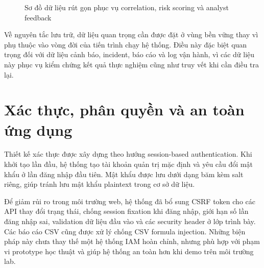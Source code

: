 \documentclass[a4paper,12pt,oneside]{book}
\begin{document}
{\begin{figure}[H]
{
}
\caption{Sơ đồ dữ liệu rút gọn phục vụ correlation, risk scoring và analyst feedback}
\label{fig:data-model-diagram}
\end{figure}

\noindent Về nguyên tắc lưu trữ, dữ liệu quan trọng cần được đặt ở vùng bền vững thay vì phụ thuộc vào vòng đời của tiến trình chạy hệ thống. Điều này đặc biệt quan trọng đối với dữ liệu cảnh báo, incident, báo cáo và log vận hành, vì các dữ liệu này phục vụ kiểm chứng kết quả thực nghiệm cũng như truy vết khi cần điều tra lại.

}

\section{Xác thực, phân quyền và an toàn ứng dụng}
{\fontsize{13pt}{15.6pt}\selectfont

Thiết kế xác thực được xây dựng theo hướng session-based authentication. Khi khởi tạo lần đầu, hệ thống tạo tài khoản quản trị mặc định và yêu cầu đổi mật khẩu ở lần đăng nhập đầu tiên. Mật khẩu được lưu dưới dạng băm kèm salt riêng, giúp tránh lưu mật khẩu plaintext trong cơ sở dữ liệu.

\noindent Để giảm rủi ro trong môi trường web, hệ thống đã bổ sung CSRF token cho các API thay đổi trạng thái, chống session fixation khi đăng nhập, giới hạn số lần đăng nhập sai, validation dữ liệu đầu vào và các security header ở lớp trình bày. Các báo cáo CSV cũng được xử lý chống CSV formula injection. Những biện pháp này chưa thay thế một hệ thống IAM hoàn chỉnh, nhưng phù hợp với phạm vi prototype học thuật và giúp hệ thống an toàn hơn khi demo trên môi trường lab.

}
\end{document}

